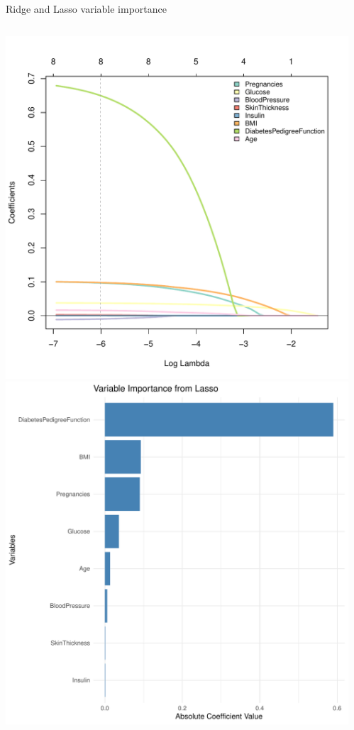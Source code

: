 \begin{frame}{Ridge and Lasso variable importance}

\vspace*{-1em}\begin{columns}[T]
\begin{column}{0.5\textwidth}
\includegraphics[width=0.85\columnwidth]{./Figures/logist/diabetes_lasso.pdf}
\includegraphics[width=0.7\columnwidth]{./Figures/logist/variable_importance_lasso.pdf}
\end{column}
\begin{column}{0.5\textwidth}

\end{column}
\end{columns}
\end{frame}
